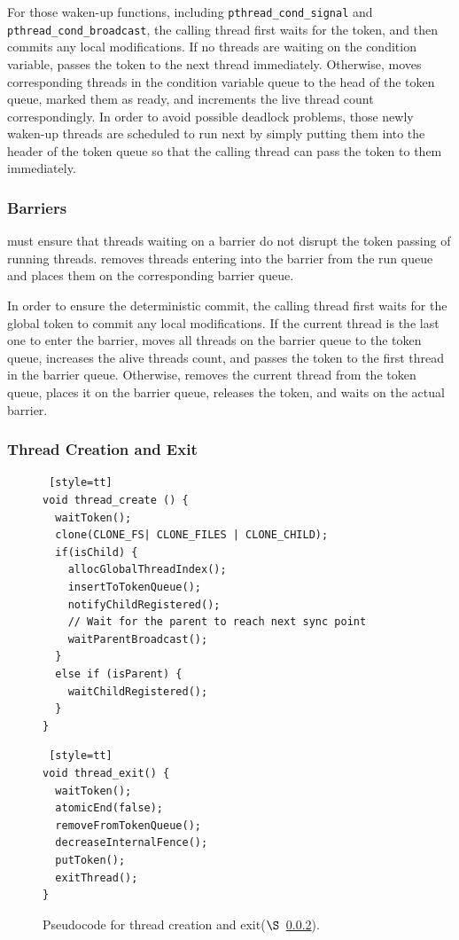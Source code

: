 For those waken-up functions, including \texttt{pthread\_cond\_signal} and \texttt{pthread\_cond\_broadcast}, the calling thread first waits for the token, and then commits any local modifications. If no threads are waiting on the condition variable, \dthreads{} passes the token to the next thread immediately. Otherwise, \dthreads{} moves corresponding threads in the condition variable queue to the head of the token queue, marked them as ready, and increments the live thread count correspondingly. In order to avoid possible deadlock problems, those newly waken-up threads are scheduled to run next by simply putting them into the header of the token queue so that the calling thread can pass the token to them immediately. 


\subsubsection{Barriers}

\label{sec:barrierwait}

\dthreads{} must ensure that threads waiting on a barrier do not disrupt the token passing of running threads. \dthreads{} removes threads entering into the barrier from the run queue and places them on the corresponding barrier queue.

In order to ensure the deterministic commit, the calling thread first waits for the global token to commit any local modifications. If the current thread is the last one to enter the barrier, \dthreads{} moves all threads on the barrier queue to the token queue, increases the alive threads count, and passes the token to the first thread in the barrier queue.  Otherwise, \dthreads{} removes the current thread from the token queue, places it on the barrier queue, releases the token, and waits on the actual barrier.


\subsubsection{Thread Creation and Exit}

\label{sec:threadcreation}

\begin{figure}
\begin{lstlisting} [style=tt]
void thread_create () {
  waitToken();
  clone(CLONE_FS| CLONE_FILES | CLONE_CHILD);
  if(isChild) {
    allocGlobalThreadIndex();
    insertToTokenQueue();
	notifyChildRegistered();
	// Wait for the parent to reach next sync point
    waitParentBroadcast();	
  }
  else if (isParent) {
    waitChildRegistered();
  }
}
\end{lstlisting}
\begin{lstlisting} [style=tt]
void thread_exit() {
  waitToken();
  atomicEnd(false);
  removeFromTokenQueue();
  decreaseInternalFence();
  putToken();
  exitThread(); 
}
\end{lstlisting}
\caption{Pseudocode for thread creation and exit($\S$~\ref{sec:threadcreation}).
\label{fig:threadcreation}
}
\end{figure}

